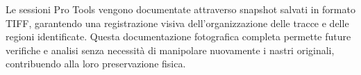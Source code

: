 Le sessioni Pro Tools vengono documentate attraverso snapshot salvati in formato TIFF, garantendo una registrazione visiva dell'organizzazione delle tracce e delle regioni identificate\cite[p. 174]{Bernardini2007recoveringgia}. Questa documentazione fotografica completa permette future verifiche e analisi senza necessità di manipolare nuovamente i nastri originali, contribuendo alla loro preservazione fisica.

